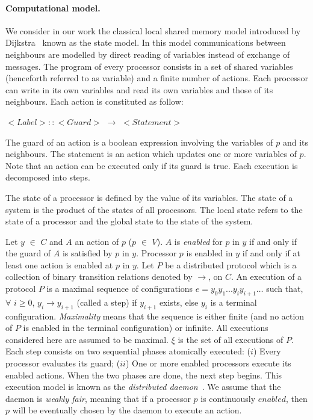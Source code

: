 \documentclass{llncs}
\begin{document}
\paragraph{\textbf{Computational model}.}
We consider in our work the classical local shared memory model introduced by Dijkstra~\cite{D74} known as the state model. In this model communications between neighbours are modelled by direct reading of variables instead of exchange of messages. The program of every processor consists in a set of shared variables (henceforth referred to as variable) and a finite number of actions. Each processor can write in its own variables and read its own variables and those of its neighbours. Each action is constituted as follow:

\begin{center} $<Label>::<Guard>$ $\rightarrow$ $<Statement>$ \end{center}

The guard of an action is a boolean expression involving the variables of $p$ and its neighbours. The statement is an action which updates one or more variables of $p$. Note that an action can be executed only if its guard is true. Each execution is decomposed into steps. 

The state of a processor is defined by the value of its variables. The state of a system is the product of the states of all processors. The local state refers to the state of a processor and the global state to the state of the system.  

Let $y$ $\in$ $C$ and $A$ an action of $p$ ($p$ $\in$ $V$). $A$ is {\em enabled} for $p$ in $y$ if and only if the guard of
$A$ is satisfied by $p$ in $y$. Processor $p$ is enabled in $y$ if and only if at least one action is enabled at $p$
in $y$. Let $P$ be a distributed protocol which is a collection of binary transition relations denoted by
$\rightarrow$, on $C$. An execution of a protocol $P$ is a maximal sequence of configurations  $e=
y_{0}y_{1}...y_{i}y_{i+1} \ldots$ such that, $\forall$ $i\ge0$, $y_{i} \rightarrow y_{i+1}$ (called a step) if $y_{i+1}$
exists, else $y_{i}$ is a terminal configuration. {\em Maximality} means that the sequence is either finite (and no action
of $P$ is enabled in the terminal configuration) or infinite. All executions considered here are assumed to be
maximal. $\xi$ is the set of all executions of $P$. 
Each step consists on two sequential phases atomically executed:
($i$) Every processor evaluates its guard;
($ii$) One or more enabled processors execute its enabled actions. 
When the two phases are done, the next step begins. 
This execution model is known as the \emph{distributed daemon}~\cite{BGM89}. 
We assume that the daemon is \emph{weakly fair}, meaning that if a processor $p$ is continuously $enabled$, 
then $p$ will be eventually chosen by the daemon to execute an action.
\end{document}
